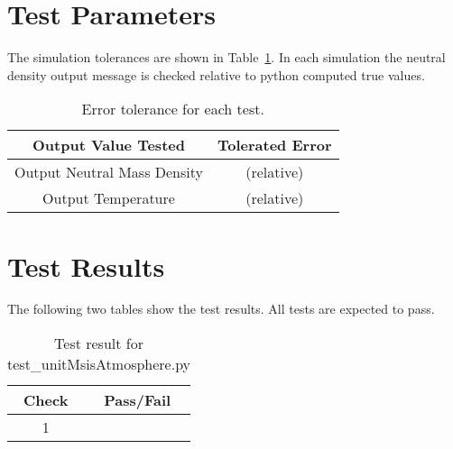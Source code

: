 \section{Test Parameters}
The simulation tolerances are shown in Table~\ref{tab:errortol}.  In each simulation the neutral density output message is checked relative to python computed true values.  
\begin{table}[htbp]
	\caption{Error tolerance for each test.}
	\label{tab:errortol}
	\centering \fontsize{10}{10}\selectfont
	\begin{tabular}{ c | c } %
		\hline\hline
		\textbf{Output Value Tested}  & \textbf{Tolerated Error}  \\ 
		\hline
		{Output Neutral Mass Density}        & { (relative) }  \\
		{Output Temperature}        &  (relative)  \\ 
		\hline\hline
	\end{tabular}
\end{table}




\section{Test Results}
The following two tables show the test results.  All tests are expected to pass.


\begin{table}[H]
	\caption{Test result for test\_unitMsisAtmosphere.py}
	\label{tab:results}
	\centering \fontsize{10}{10}\selectfont
	\begin{tabular}{c  | c } %
		\hline\hline
		\textbf{Check} &  \textbf{Pass/Fail} \\ 
		\hline
		1 &   \\ 
		\hline
		\hline
	\end{tabular}
\end{table}


